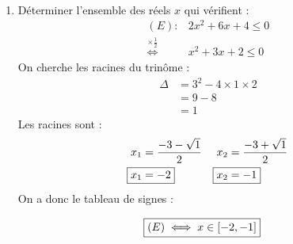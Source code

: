 \begin{exercice}~
    \begin{enumerate}
    \item Déterminer l'ensemble des réels $x$ qui vérifient :
    \begin{align*}
        (E) : &2x^2 + 6x + 4 \leq 0 \\ 
        \overset{\times \frac{1}{2}}{\iff} &x^2 + 3x + 2 \leq 0
    \end{align*}
    On cherche les racines du trinôme :
    \begin{align*}
        \Delta &= 3^2 - 4 \times 1 \times 2 \\
               &= 9 - 8 \\
               &= 1
    \end{align*}
    Les racines sont :
    \begin{align*}
        x_1 &= \frac{-3 - \sqrt{1}}{2} & x_2 &= \frac{-3 + \sqrt{1}}{2} \\
        \Aboxed{x_1 &= -2}             & \Aboxed{x_2 &= -1}                             
    \end{align*}
    On a donc le tableau de signes :
    \begin{figure}[h!]
        \centering
    \end{figure}
    \begin{figure}[h!]
        \centering
        \begin{align*}
            \Aboxed{(E) \iff x \in [-2, -1]}
        \end{align*}
    \end{figure}


\end{enumerate}
\end{exercice}
